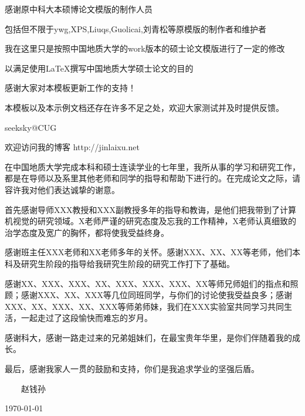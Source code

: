 \begin{thanks}

感谢原中科大本硕博论文模版的制作人员

包括但不限于ywg,XPS,Liuqs,Guolicai,刘青松等原模版的制作者和维护者

我在这里只是按照中国地质大学的work版本的硕士论文模版进行了一定的修改

以满足使用\LaTeX 撰写中国地质大学硕士论文的目的

感谢大家对本模板更新工作的支持！

本模板以及本示例文档还存在许多不足之处，欢迎大家测试并及时提供反馈。

\begin{flushright}
seeksky@CUG

欢迎访问我的博客 http://jinlaixu.net
\end{flushright}


在中国地质大学完成本科和硕士连读学业的七年里，我所从事的学习和研究工作，都是在导师以及系里其他老师和同学的指导和帮助下进行的。在完成论文之际，请容许我对他们表达诚挚的谢意。

首先感谢导师XXX教授和XXX副教授多年的指导和教诲，是他们把我带到了计算机视觉的研究领域。X老师严谨的研究态度及忘我的工作精神，X老师认真细致的治学态度及宽广的胸怀，都将使我受益终身。

感谢班主任XXX老师和XX老师多年的关怀。感谢XXX、XX、XX等老师，他们本科及研究生阶段的指导给我研究生阶段的研究工作打下了基础。

感谢XX、XXX、XXX、XX、XXX、XXX、XXX、XX等师兄师姐们的指点和照顾；感谢XXX、XX、XXX等几位同班同学，与你们的讨论使我受益良多；感谢XXX、XX、XXX、XX、XXX等师弟师妹，我们在XXX实验室共同学习共同生活，一起走过了这段愉快而难忘的岁月。

感谢科大，感谢一路走过来的兄弟姐妹们，在最宝贵年华里，是你们伴随着我的成长。

最后，感谢我家人一贯的鼓励和支持，你们是我追求学业的坚强后盾。

\vskip 18pt

\begin{flushright}

~~~~赵钱孙~~~~

\today

\end{flushright}

\end{thanks}
